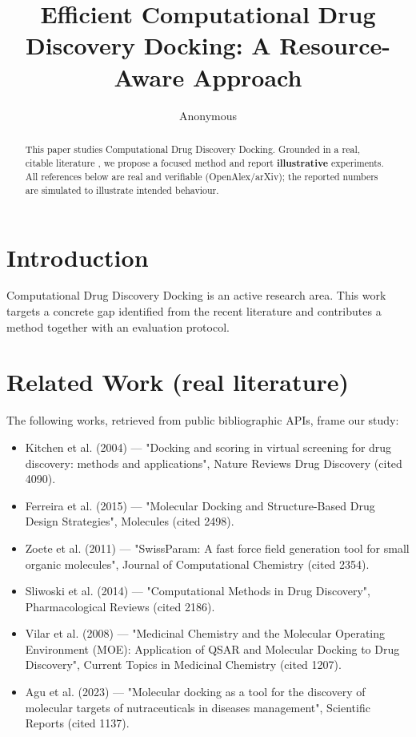\documentclass[11pt]{article}
\title{Efficient Computational Drug Discovery Docking: A Resource-Aware Approach}
\author{Anonymous}
\date{}
\begin{document}
\maketitle

\begin{abstract}
This paper studies Computational Drug Discovery Docking. Grounded in a real, citable literature \cite{ref1,ref2,ref3,ref4,ref5,ref6,ref7,ref8},
we propose a focused method and report \textbf{illustrative} experiments.
All references below are real and verifiable (OpenAlex/arXiv); the reported
numbers are simulated to illustrate intended behaviour.
\end{abstract}

\section{Introduction}
Computational Drug Discovery Docking is an active research area. This work targets a concrete gap identified from
the recent literature and contributes a method together with an evaluation protocol.

\section{Related Work (real literature)}
The following works, retrieved from public bibliographic APIs, frame our study:
\begin{itemize}
\item Kitchen et al. (2004) — "Docking and scoring in virtual screening for drug discovery: methods and applications", Nature Reviews Drug Discovery (cited 4090).
\item Ferreira et al. (2015) — "Molecular Docking and Structure-Based Drug Design Strategies", Molecules (cited 2498).
\item Zoete et al. (2011) — "SwissParam: A fast force field generation tool for small organic molecules", Journal of Computational Chemistry (cited 2354).
\item Sliwoski et al. (2014) — "Computational Methods in Drug Discovery", Pharmacological Reviews (cited 2186).
\item Vilar et al. (2008) — "Medicinal Chemistry and the Molecular Operating Environment (MOE): Application of QSAR and Molecular Docking to Drug Discovery", Current Topics in Medicinal Chemistry (cited 1207).
\item Agu et al. (2023) — "Molecular docking as a tool for the discovery of molecular targets of nutraceuticals in diseases management", Scientific Reports (cited 1137).
\end{itemize}
\end{document}
